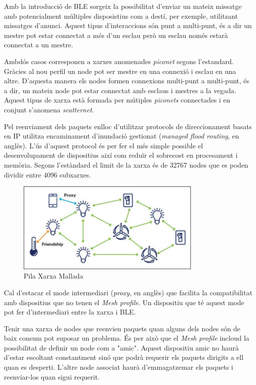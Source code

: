 Amb la introducció de BLE sorgeix la possibilitat d'enviar un mateix missatge amb potencialment múltiples disposistius com a destí, per exemple, utilitzant missatges d'anunci.
Aquest tipus d'interaccions són punt a multi-punt, és a dir un mestre pot estar connectat a més d'un esclau però un esclau només estarà connectat a un mestre.

Ambdós casos corresponen a xarxes anomenades \textit{piconet} segons l'estandard.
Gràcies al nou perfil un node pot ser mestre en una connexió i esclau en una altre.
D'aquesta manera els nodes formen connexions multi-punt a multi-punt, és a dir, un mateix node pot estar connectat amb esclaus i mestres a la vegada.
Aquest tipus de xarxa està formada per mútiples \textit{piconets} connectades i en conjunt s'anomena \textit{scatternet}.

Pel reenviament dels paquets enlloc d'utilitzar protocols de direccionament basats en IP utilitza encaminament d’inundació gestionat (\textit{managed flood routing}, en anglès).
L'ús d'aquest protocol és per fer el més simple possible el desenvolupament de dispositius així com reduïr el sobrecost en procesament i memòria.
Segons l'estàndard el limit de la xarxa és de 32767 nodes que es poden dividir entre 4096 subxarxes.

\begin{figure}[!h]
	\begin{center}
		\includegraphics[width=0.8\textwidth]{./images/mesh_profile_features.jpg}
		\caption{Pila Xarxa Mallada \cite{Mesh Profile}}
	\end{center}
\end{figure}

Cal d'estacar el mode intermediari (\textit{proxy}, en anglès) que facilita la compatibilitat amb dispositius que no tenen el \textit{Mesh profile}.
Un dispositiu que té aquest mode pot fer d'intermediari entre la xarxa i BLE.

Tenir una xarxa de nodes que reenvien paquets quan alguns dels nodes són de baix consum pot suposar un problema.
És per això que el \textit{Mesh profile} incloud la possibilitat de definir un node com a "amic".
Aquest dispositiu amic no haurà d'estar escoltant constantment sinó que podrà requerir els paquets dirigits a ell quan es desperti.
L'altre node associat haurà d'emmagatzemar els paquets i reenviar-los quan sigui requerit.

